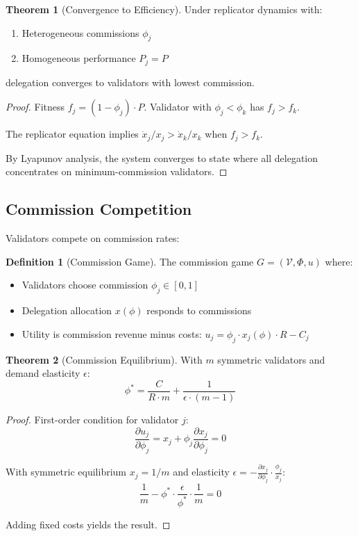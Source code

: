 \documentclass[11pt,a4paper]{article}
\theoremstyle{definition}
\newtheorem{definition}{Definition}[section]
\newtheorem{theorem}{Theorem}[section]
\theoremstyle{remark}
\begin{document}
\begin{theorem}[Convergence to Efficiency]
Under replicator dynamics with:
\begin{enumerate}
    \item Heterogeneous commissions $\phi_j$
    \item Homogeneous performance $P_j = P$
\end{enumerate}
delegation converges to validators with lowest commission.
\end{theorem}

\begin{proof}
Fitness $f_j = (1 - \phi_j) \cdot P$. Validator with $\phi_j < \phi_k$ has $f_j > f_k$.

The replicator equation implies $\dot{x}_j / x_j > \dot{x}_k / x_k$ when $f_j > f_k$.

By Lyapunov analysis, the system converges to state where all delegation concentrates on minimum-commission validators.
\end{proof}

\subsection{Commission Competition}

Validators compete on commission rates:

\begin{definition}[Commission Game]
The commission game $G = (\mathcal{V}, \Phi, u)$ where:
\begin{itemize}
    \item Validators choose commission $\phi_j \in [0, 1]$
    \item Delegation allocation $x(\phi)$ responds to commissions
    \item Utility is commission revenue minus costs: $u_j = \phi_j \cdot x_j(\phi) \cdot R - C_j$
\end{itemize}
\end{definition}

\begin{theorem}[Commission Equilibrium]
With $m$ symmetric validators and demand elasticity $\epsilon$:
\begin{equation}
    \phi^* = \frac{C}{R \cdot m} + \frac{1}{\epsilon \cdot (m-1)}
\end{equation}
\end{theorem}

\begin{proof}
First-order condition for validator $j$:
\begin{equation}
    \frac{\partial u_j}{\partial \phi_j} = x_j + \phi_j \frac{\partial x_j}{\partial \phi_j} = 0
\end{equation}

With symmetric equilibrium $x_j = 1/m$ and elasticity $\epsilon = -\frac{\partial x_j}{\partial \phi_j} \cdot \frac{\phi_j}{x_j}$:
\begin{equation}
    \frac{1}{m} - \phi^* \cdot \frac{\epsilon}{\phi^*} \cdot \frac{1}{m} = 0
\end{equation}

Adding fixed costs yields the result.
\end{proof}
\end{document}
